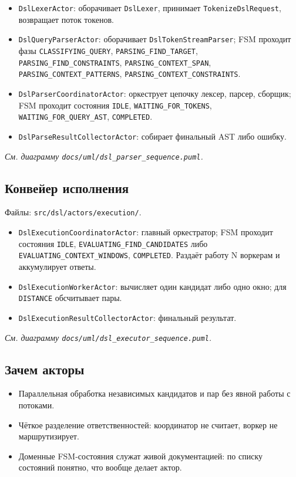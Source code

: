 \documentclass[12pt,a4paper]{article}
\newcommand{\uml}[1]{\textit{См. диаграмму \texttt{docs/uml/#1}.}}
\newcommand{\code}[1]{\texttt{#1}}
\begin{document}
\begin{itemize}
  \item \code{DslLexerActor}: оборачивает \code{DslLexer},
        принимает \code{TokenizeDslRequest}, возвращает поток токенов.
  \item \code{DslQueryParserActor}: оборачивает
        \code{DslTokenStreamParser}; FSM проходит фазы
        \code{CLASSIFYING\_QUERY}, \code{PARSING\_FIND\_TARGET},
        \code{PARSING\_FIND\_CONSTRAINTS}, \code{PARSING\_CONTEXT\_SPAN},
        \code{PARSING\_CONTEXT\_PATTERNS},
        \code{PARSING\_CONTEXT\_CONSTRAINTS}.
  \item \code{DslParserCoordinatorActor}: оркеструет цепочку
        лексер, парсер, сборщик; FSM проходит состояния
        \code{IDLE}, \code{WAITING\_FOR\_TOKENS},
        \code{WAITING\_FOR\_QUERY\_AST}, \code{COMPLETED}.
  \item \code{DslParseResultCollectorActor}: собирает финальный
        AST либо ошибку.
\end{itemize}

\uml{dsl\_parser\_sequence.puml}

\subsection{Конвейер исполнения}

Файлы: \code{src/dsl/actors/execution/}.

\begin{itemize}
  \item \code{DslExecutionCoordinatorActor}: главный оркестратор;
        FSM проходит состояния \code{IDLE},
        \code{EVALUATING\_FIND\_CANDIDATES} либо
        \code{EVALUATING\_CONTEXT\_WINDOWS}, \code{COMPLETED}.
        Раздаёт работу N воркерам и аккумулирует ответы.
  \item \code{DslExecutionWorkerActor}: вычисляет один кандидат
        либо одно окно; для \code{DISTANCE} обсчитывает пары.
  \item \code{DslExecutionResultCollectorActor}: финальный
        результат.
\end{itemize}

\uml{dsl\_executor\_sequence.puml}

\subsection{Зачем акторы}

\begin{itemize}
  \item Параллельная обработка независимых кандидатов и пар без явной
        работы с потоками.
  \item Чёткое разделение ответственностей: координатор не считает,
        воркер не маршрутизирует.
  \item Доменные FSM-состояния служат живой документацией: по списку
        состояний понятно, что вообще делает актор.
\end{itemize}
\end{document}
